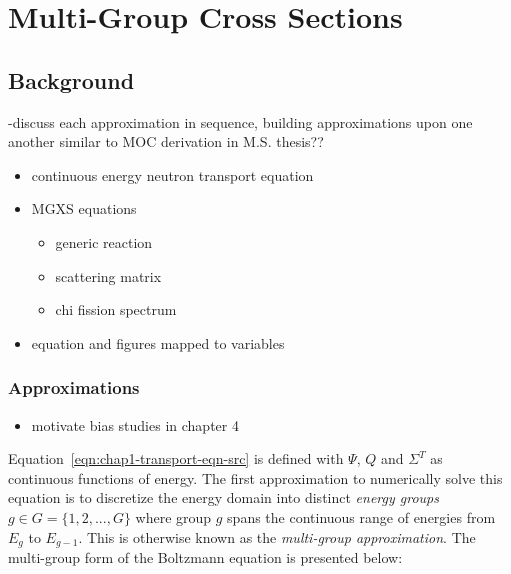 \chapter{Multi-Group Cross Sections}
\label{chap:mgxs}

\section{Background}
\label{sec:chap2-background}

-discuss each approximation in sequence, building approximations upon one another similar to \ac{MOC} derivation in M.S. thesis?? \\

\begin{itemize}[noitemsep]
  \item continuous energy neutron transport equation
  \item \ac{MGXS} equations
  \begin{itemize}[noitemsep]
    \item generic reaction
    \item scattering matrix
    \item chi fission spectrum
  \end{itemize}
  \item equation and figures mapped to variables
\end{itemize}


\subsection{Approximations}
\label{subsec:chap2-approx}

\begin{itemize}
  \item motivate bias studies in chapter 4
\end{itemize}

Equation~\ref{eqn:chap1-transport-eqn-src} is defined with $\Psi$, $Q$ and $\Sigma^T$ as continuous functions of energy. The first approximation to numerically solve this equation is to discretize the energy domain into distinct \textit{energy groups} $g \in G = \{1, 2, ..., G\}$ where group $g$ spans the continuous range of energies from $E_{g}$ to $E_{g-1}$. This is otherwise known as the \textit{multi-group approximation}. The multi-group form of the Boltzmann equation is presented below:

